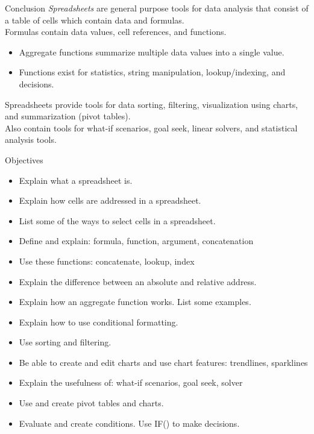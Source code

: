\documentclass[xcolor=svgnames]{beamer}
\begin{document}
\begin{frame}[label=current]{Conclusion}
\emph{Spreadsheets} are general purpose tools for data analysis that consist of a table of cells which contain data and formulas.\\[1em]
Formulas contain data values, cell references, and functions.
\begin{itemize}
\item Aggregate functions summarize multiple data values into a single value.
\item Functions exist for statistics, string manipulation, lookup/indexing, and decisions.
\end{itemize}
Spreadsheets provide tools for data sorting, filtering, visualization using charts, and summarization (pivot tables).  \\[1em]
Also contain tools for what-if scenarios, goal seek, linear solvers, and statistical analysis tools.
\end{frame}

\begin{frame}{Objectives}
\begin{itemize}
\item Explain what a spreadsheet is.
\item Explain how cells are addressed in a spreadsheet.
\item List some of the ways to select cells in a spreadsheet.
\item Define and explain: formula, function, argument, concatenation
\item Use these functions: concatenate, lookup, index
\item Explain the difference between an absolute and relative address.
\item Explain how an aggregate function works.  List some examples.
\item Explain how to use conditional formatting.
\item  Use sorting and filtering.
\item Be able to create and edit charts and use chart features: trendlines, sparklines
\item Explain the usefulness of: what-if scenarios, goal seek, solver
\item Use and create pivot tables and charts.
\item Evaluate and create conditions. Use IF() to make decisions.
\end{itemize}
\end{frame}
\end{document}
